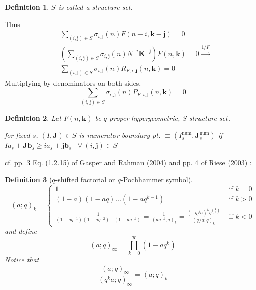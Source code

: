 \documentclass[10pt]{amsart}
\newtheorem{definition}{Definition}
\begin{document}
\begin{multicols*}{2}
\begin{definition}
$S$ is called a structure set.  
\end{definition}

Thus
\begin{align}
& \sum_{(i,\mathbf{j}) \in S} \sigma_{i,\mathbf{j}}(n)F(n-i,\mathbf{k}-\mathbf{j}) = 0 =\\
& \left( \sum_{(i,\mathbf{j}) \in S}\sigma_{i,\mathbf{j}}(n) N^{-i}\mathbf{K}^{-\mathbf{j}} \right)F(n,\mathbf{k}) = 0 \xrightarrow{ 1/F} \\
  & \sum_{(i,\mathbf{j})\in S}\sigma_{i,\mathbf{j}}(n)R_{F,i,\mathbf{j}}(n,\mathbf{k}) = 0 
\end{align}
Multiplying by denominators on both sides, 
\begin{equation}
\sum_{(i,\mathbb{j})\in S}\sigma_{i,\mathbf{j}}(n) P_{F,i,\mathbf{j}}(n,\mathbf{k})=0
\end{equation}

\begin{definition}
Let $F(n,\mathbf{k})$ be $q$-proper hypergeometric, $S$ structure set.  

for fixed $s$, $(I,\mathbf{J}) \in S$ is numerator boundary pt. $\equiv (I_s^{\text{num}}, \mathbf{J}_s^{\text{num}})$ if $Ia_s + \mathbf{J} \mathbf{b}_s \geq ia_s + \mathbf{j} \mathbf{b}_s$ \quad \, $\forall \, (i,\mathbf{j}) \in S$
\end{definition}

cf. pp. 3 Eq. (1.2.15) of Gasper and Rahman (2004) \cite{GGasperMRahman2004} and pp. 4 of Riese (2003) \cite{ARiese2003}:
\begin{definition}[$q$-shifted factorial or $q$-Pochhammer symbol]
  \begin{equation}
    (a;q)_k = \begin{cases} 1 & \text{ if } k = 0 \\
      (1-a)(1-aq)\dots (1-aq^{k-1}) & \text{ if } k > 0 \\
      \frac{1}{(1-aq^{-1})(1-aq^{-2})\dots (1-aq^{-k}) } = \frac{1}{(aq^{-k}; q)_k } = \frac{ (-q/a)^kq^{\binom{k}{2}} }{ (q/a;q)_k } & \text{ if } k <0 \end{cases}
  \end{equation}
and define
\begin{equation}
  (a;q)_{\infty} = \coprod_{k=0}^{\infty}(1-aq^k)
\end{equation}
Notice that 
\begin{equation}
  \frac{ (a;q)_{\infty} }{ (q^ka;q)_{\infty} } = (a;q)_k
\end{equation}
\end{definition}


\end{multicols*}
\end{document}
